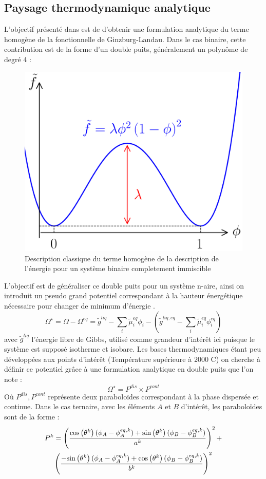 \subsection{Paysage thermodynamique analytique}
L'objectif présenté dans \cite{noauthor_numerical_nodate} est de d'obtenir une formulation analytique du terme homogène de la fonctionnelle de Ginzburg-Landau. Dans le cas binaire, cette contribution est de la forme d'un double puits, généralement un polynôme de degré 4 :
\begin{figure}[H]
	\centering
	\includegraphics[width=0.3\linewidth]{figure/figpolydeg4}
	\caption{Description classique du terme homogène de la description de l'énergie pour un système binaire completement immiscible}
	\label{fig:figpolydeg4}
\end{figure}
L'objectif est de généraliser ce double puits pour un système n-aire, ainsi on introduit un pseudo grand potentiel correspondant à la hauteur énergétique nécessaire pour changer de minimum d'énergie \cite{cardon_modelisation_2016}.
\begin{equation}
\Omega^{\star} =\Omega - \Omega^{eq} =  \tilde{g}^{liq} - \sum_i \tilde{\mu}_i^{eq}\phi_i - \left(  \tilde{g}^{liq,eq} -  \sum_i \tilde{\mu}_i^{eq}\phi_i^{eq} \right) 
\end{equation}
avec $\tilde{g}^{liq}$ l'énergie libre de Gibbs, utilisé comme grandeur d'intérêt ici puisque le système est supposé isotherme et isobare.
Les bases thermodynamiques étant peu développées aux points d'intérêt (Température supérieure à 2000 \textdegree C) on cherche à définir ce potentiel grâce à une formulation analytique en double puits que l'on note :
\begin{equation}\label{double_puit}
	\Omega^{\star}  = P^{dis} \times P^{cont}
\end{equation}
Où $P^{dis}, P^{cont}$ représente deux paraboloïdes correspondant à la phase dispersée et continue. Dans le cas ternaire, avec les éléments $A$ et $B$ d'intérêt, les paraboloïdes sont de la forme : 
\begin{multline}
P^{k}=\left(\frac{\text{cos}\left(\theta^{k}\right)(\phi_{A}-\phi_{A}^{eq,k}) + \text{sin}\left(\theta^{k}\right)(\phi_{B}-\phi_{B}^{eq,k})}{a_{}^{k}}\right)^{2}+\\ \left(\frac{-\text{sin}\left(\theta^{k}\right)(\phi_{A}-\phi_{A}^{eq,k}) + \text{cos}\left(\theta^{k}\right)(\phi_{B}-\phi_{B}^{eq,k})}{b^{k}}\right)^{2}
\label{eq:paraboloid_general_}
\end{multline}

